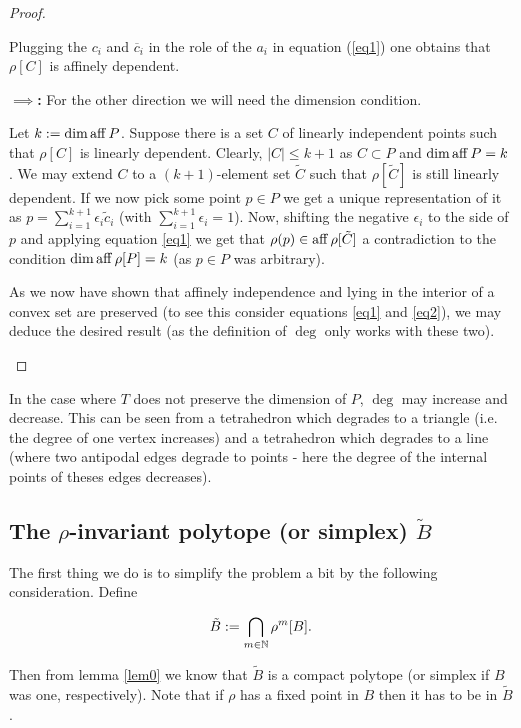 \documentclass{article}
\begin{document}
\begin{proof}
\begin{enumerate}
Plugging the $c_i$ and $\overline{c}_i$ in the role of the $a_i$ in equation (\ref{eq1}) one obtains that $\rho[C]$ is affinely dependent.

\textbf{$\implies$:} For the other direction we will need the dimension condition. 

Let $k:=\dim\operatorname{aff}{P}$.
Suppose there is a set $C$ of linearly independent points such that $\rho[C]$ is linearly dependent. Clearly, $|C|\leq k+1$ as $C\subset P$ and $\dim\operatorname{aff} P=k$. We may extend $C$ to a $(k+1)$-element set $\tilde{C}$ such that $\rho[\tilde{C}]$ is still linearly dependent. If we now pick some point $p\in P$ we get a unique representation of it as $p = \sum_{i=1}^{k+1}{\epsilon_i \tilde{c}_i}$ (with $\sum_{i=1}^{k+1}{\epsilon_i}=1$). Now, shifting the negative $\epsilon_i$ to the side of $p$ and applying equation \ref{eq1} we get that $\rho(p)\in\operatorname{aff}\rho[\tilde{C}]$ a contradiction to the condition $\dim\operatorname{aff}\rho[P]=k$ (as $p\in P$ was arbitrary).

As we now have shown that affinely independence and lying in the interior of a convex set are preserved (to see this consider equations \ref{eq1} and \ref{eq2}), we may deduce the desired result (as the definition of $\deg$ only works with these two).
\end{enumerate}
\end{proof}

\begin{remark}
In the case where $T$ does not preserve the dimension of $P$, $\deg$ may increase and decrease. This can be seen from a tetrahedron which degrades to a triangle (i.e. the degree of one vertex increases) and a tetrahedron which degrades to a line (where two antipodal edges degrade to points - here the degree of the internal points of theses edges decreases).
\end{remark}

\subsection{The $\rho$-invariant polytope (or simplex) $\tilde{B}$}

The first thing we do is to simplify the problem a bit by the following consideration. Define

\begin{equation} 
\tilde{B}:=\bigcap_{m\in\mathbb{N}}{\rho^m[B]}\text{.}
\end{equation} 

Then from lemma \ref{lem0} we know that $\tilde{B}$ is a compact polytope (or simplex if $B$ was one, respectively).
Note that if $\rho$ has a fixed point in $B$ then it has to be in $\tilde{B}$.
\end{document}
